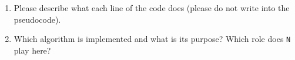 \begin{center}
	\vspace*{-0.5cm}
	\begin{minipage}{0.8\textwidth}
		
	\end{minipage}
\end{center}
%	
	\begin{enumerate}
		\item Please describe what each line of the code does (please do not write into the pseudocode).
		\item Which algorithm is implemented and what is its purpose? Which role does \verb|N| play here?
	\end{enumerate}

